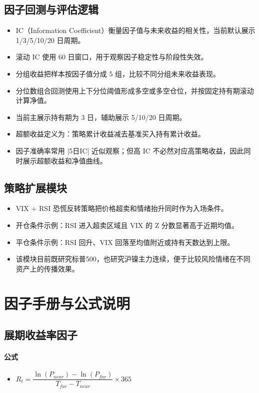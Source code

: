 \documentclass[11pt,a4paper]{ctexart}
\begin{document}
\subsection{因子回测与评估逻辑}
\begin{itemize}
\item IC（Information Coefficient）衡量因子值与未来收益的相关性，当前默认展示 1/3/5/10/20 日周期。
\item 滚动 IC 使用 60 日窗口，用于观察因子稳定性与阶段性失效。
\item 分组收益把样本按因子值分成 5 组，比较不同分组未来收益表现。
\item 分位数组合回测使用上下分位阈值形成多空或多空仓位，并按固定持有期滚动计算净值。
\item 当前主展示持有期为 3 日，辅助展示 5/10/20 日周期。
\item 超额收益定义为：策略累计收益减去基准买入持有累计收益。
\item 因子准确率常用 |5日IC| 近似观察；但高 IC 不必然对应高策略收益，因此同时展示超额收益和净值曲线。
\end{itemize}

\subsection{策略扩展模块}
\begin{itemize}
\item VIX + RSI 恐慌反转策略把价格超卖和情绪抬升同时作为入场条件。
\item 开仓条件示例：RSI 进入超卖区域且 VIX 的 Z 分数显著高于近期均值。
\item 平仓条件示例：RSI 回升、VIX 回落至均值附近或持有天数达到上限。
\item 该模块目前既研究标普500，也研究沪镍主力连续，便于比较风险情绪在不同资产上的传播效果。
\end{itemize}
        \section{因子手册与公式说明}
\subsection{展期收益率因子}
\paragraph{公式}
\begin{itemize}
\item $R_t=\dfrac{\ln(P_{near})-\ln(P_{far})}{T_{far}-T_{near}}\times 365$
\end{itemize}
\end{document}
